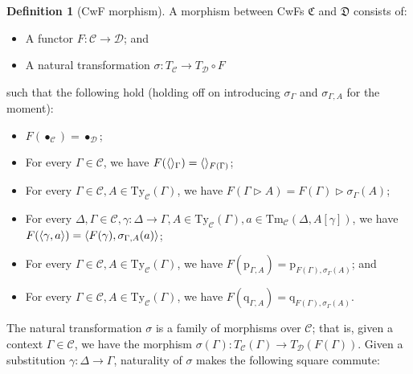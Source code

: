 \documentclass{article}
\renewcommand{\_}{\textrm{\textscale{.5}{\textunderscore}}}
\DeclarePairedDelimiter{\ctxt}{\langle}{\rangle}
\newcommand{\nt}{\sigma}
\newcommand{\Tm}{\mathrm{Tm}}
\newcommand{\Ty}{\mathrm{Ty}}
\newcommand{\p}{\mathrm{p}}
\newcommand{\q}{\mathrm{q}}
\theoremstyle{definition}
\newtheorem{definition}{Definition}[section]
\theoremstyle{plain}
\begin{document}
\begin{definition}[CwF morphism] \label{def:cwf-morphism}
A morphism between CwFs $\mathfrak{C}$ and $\mathfrak{D}$ consists of:
\begin{itemize}
    \item A functor $F : \mathcal{C} \to \mathcal{D}$; and
    \item A natural transformation $\nt : T_\mathcal{C} \to T_\mathcal{D} \circ F$
\end{itemize}
such that the following hold (holding off on introducing $\nt_{\Gamma}$ and $\nt_{\Gamma, A}$ for the moment):
\begin{itemize}
    \item $F(\bullet_{\mathcal{C}}) = \bullet_{\mathcal{D}}$;
    \item For every $\Gamma \in \mathcal{C}$, we have $F(\ctxt{}_{\Gamma}) = \ctxt{}_{F(\Gamma)}$;
    \item For every $\Gamma \in \mathcal{C}, A \in \Ty_\mathcal{C}(\Gamma)$, we have
    $F(\Gamma \rhd A) = F(\Gamma) \rhd \nt_\Gamma(A)$;
    \item For every $\Delta, \Gamma \in \mathcal{C}, \gamma : \Delta \to \Gamma, A \in \Ty_\mathcal{C}(\Gamma), a \in \Tm_\mathcal{C}(\Delta, A[\gamma])$, we have
    $F(\ctxt{\gamma, a}) = \ctxt{F(\gamma), \nt_{\Gamma, A}(a)}$;
    \item For every $\Gamma \in \mathcal{C}, A \in \Ty_\mathcal{C}(\Gamma)$, we have
    $F(\p_{\Gamma, A}) = \p_{F(\Gamma), \nt_{\Gamma}(A)}$; and
    \item For every $\Gamma \in \mathcal{C}, A \in \Ty_\mathcal{C}(\Gamma)$, we have
    $F(\q_{\Gamma, A}) = \q_{F(\Gamma), \nt_{\Gamma}(A)}$.
\end{itemize}
\end{definition}

The natural transformation $\nt$ is a family of morphisms over $\mathcal{C}$;
that is, given a context $\Gamma \in \mathcal{C}$, we have the morphism
$\nt(\Gamma) : T_{\mathcal{C}}(\Gamma) \to T_{\mathcal{D}}(F(\Gamma))$.
Given a substitution $\gamma : \Delta \to \Gamma$,
naturality of $\nt$ makes the following square commute:

\begin{center}
\end{center}
\end{document}
